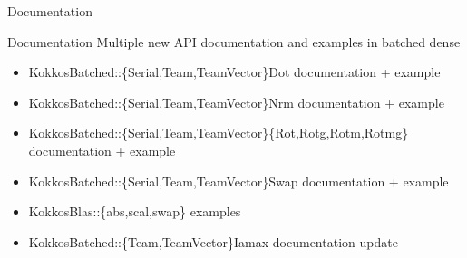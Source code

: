 \begin{frame}[fragile]

  {\Huge Documentation}

  \vspace{10pt}

\end{frame}

\begin{frame}[fragile]{Documentation}
  Multiple new API documentation and examples in batched dense
  \begin{itemize}
    \item {\ttfamily KokkosBatched::\{Serial,Team,TeamVector\}Dot} documentation + example
    \item {\ttfamily KokkosBatched::\{Serial,Team,TeamVector\}Nrm} documentation + example
    \item {\ttfamily KokkosBatched::\{Serial,Team,TeamVector\}\{Rot,Rotg,Rotm,Rotmg\}} documentation + example
    \item {\ttfamily KokkosBatched::\{Serial,Team,TeamVector\}Swap} documentation + example
    \item {\ttfamily KokkosBlas::\{abs,scal,swap\}} examples
    \item {\ttfamily KokkosBatched::\{Team,TeamVector\}Iamax} documentation update
  \end{itemize}
\end{frame}
